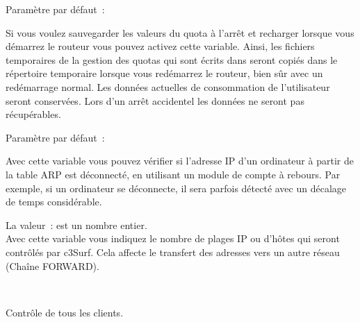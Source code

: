 \begin{itemize}
\begin{description}

  Paramètre par défaut~: 

  Si vous voulez sauvegarder les valeurs du quota à l'arrêt et recharger lorsque vous
  démarrez le routeur vous pouvez activez cette variable. Ainsi, les fichiers
  temporaires de la gestion des quotas qui sont écrits dans
   seront copiés dans le
  répertoire temporaire lorsque vous redémarrez le routeur, bien sûr avec un redémarrage
  normal. Les données actuelles de consommation de l'utilisateur seront conservées.
  Lors d'un arrêt accidentel les données ne seront pas récupérables.



  Paramètre par défaut~: 

  Avec cette variable vous pouvez vérifier si l'adresse IP d'un ordinateur à partir
  de la table ARP est déconnecté, en utilisant un module de compte à rebours. Par exemple,
  si un ordinateur se déconnecte, il sera parfois détecté avec un décalage de temps
  considérable.



  La valeur~: est un nombre entier.\\
  Avec cette variable vous indiquez le nombre de plages IP ou d'hôtes qui seront
  contrôlés par c3Surf. Cela affecte le transfert des adresses vers un autre réseau
  (Chaîne FORWARD).

\ \\

  Contrôle de tous les clients.



\end{description}
\end{itemize}
